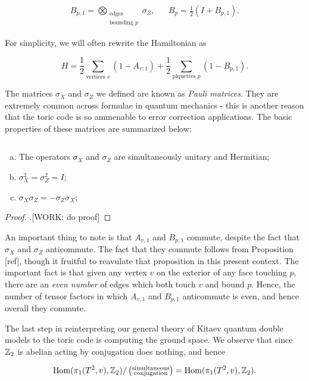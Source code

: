 \begin{align*}
B_{p,1}=\bigotimes_{\substack{\text{edges} \\ \text{bounding }p}}\sigma_Z, && B_p=\frac{1}{2}\left(I + B_{p,1}\right).
\end{align*}

For simplicity, we will often rewrite the Hamiltonian as

$$H=\frac{1}{2}\sum_{\text{vertices }v}(1-A_{v,1})+\frac{1}{2}\sum_{\text{plquettes }p}(1-B_{p,1}).$$

The matrices $\sigma_X$ and $\sigma_Z$ we defined are known as \textit{Pauli matrices}. They are extremely common across formulae in quantum mechanics - this is another reason that the toric code is so ammenable to error correction applications. The basic properties of these matrices are summarized below:

\begin{proposition}$\,$
\begin{enumerate}[(a)]
\item The operators $\sigma_X$ and $\sigma_Z$ are simultaneously unitary and Hermitian;
\item $\sigma_X^2=\sigma_Z^2=I$;
\item $\sigma_X \sigma_Z = - \sigma_Z \sigma_X$;
\end{enumerate}
\end{proposition}
\begin{proof}.[WORK: do proof]
\end{proof}

An important thing to note is that $A_{v,1}$ and $B_{p,1}$ commute, despite the fact that $\sigma_X$ and $\sigma_Z$ anticommute. The fact that they commute follows from Proposition [ref], though it fruitful to reavulate that proposition in this present context. The important fact is that given any vertex $v$ on the exterior of any face touching $p$,  there are an \textit{even number} of edges which both touch $v$ and bound $p$. Hence, the number of tensor factors in which $A_{v,1}$ and $B_{p,1}$ anticommute is even, and hence overall they commute.

The last step in reinterpreting our general theory of Kitaev quantum double models to the toric code is computing the ground space. We observe that since $\mathbb{Z}_2$ is abelian acting by conjugation does nothing, and hence

$$\operatorname{Hom}(\pi_1(T^2,v), \mathbb{Z}_2)/\left(\substack{\text{simultaneous} \\ \text{conjugation}}\right)=\operatorname{Hom}(\pi_1(T^2,v), \mathbb{Z}_2).$$

